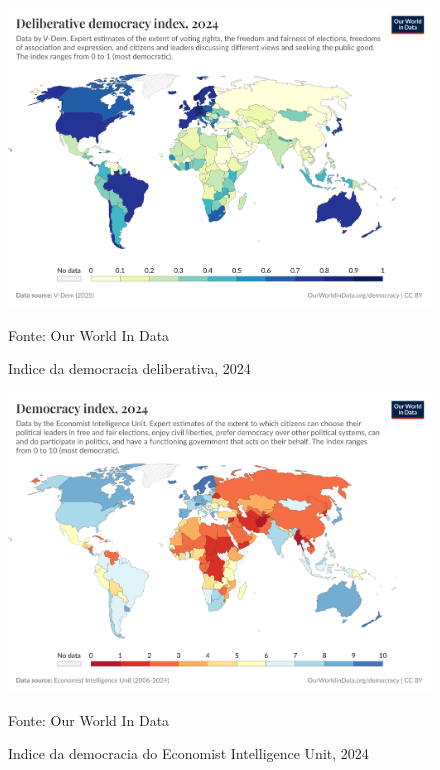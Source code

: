 \begin{figure}
    \centering
    \includegraphics[width=1\linewidth]{figuras/democracia/deliberative-democracy-index-vdem.png}
    \caption{Indice da democracia deliberativa, 2024}
    \label{fig:deliberative-democracy-index-vdem}
    \footnotesize{Fonte: Our World In Data}
\end{figure}

\begin{figure}
    \centering
    \includegraphics[width=1\linewidth]{figuras/democracia/democracy-index-eiu.png}
    \caption{Indice da democracia do Economist Intelligence Unit, 2024}
    \label{fig:democracy-index-eiu}
    \footnotesize{Fonte: Our World In Data}
\end{figure}
